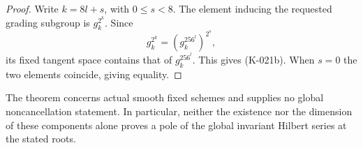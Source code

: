 \begin{proof}
Write $k=8l+s$, with $0\le s<8$.  The element inducing the
requested grading subgroup is $g_k^{2^k}$.  Since
\[
                 g_k^{2^k}=(g_k^{256^l})^{2^s},
\]
its fixed tangent space contains that of $g_k^{256^l}$.  This gives
(K-021b).  When $s=0$ the two elements coincide, giving equality.
\end{proof}

The theorem concerns actual smooth fixed schemes and supplies no
global noncancellation statement.  In particular, neither the
existence nor the dimension of these components alone proves a
pole of the global invariant Hilbert series at the stated roots.
